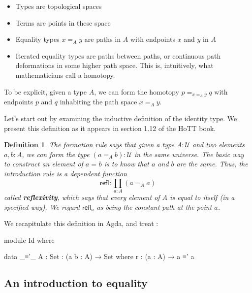 \documentclass[11pt, a4paper]{article}
\newtheorem{definition}{Definition}
\newcommand{\refl}[1]{\ensuremath{\mathsf{refl}_{#1}}\xspace}
\newcommand{\define}[1]{\textbf{#1}}
\newcommand{\id}[3][]{\ensuremath{#2 =_{#1} #3}\xspace}
\newcommand{\UU}{\ensuremath{\mathcal{U}}\xspace}
\begin{document}
\begin{itemize}[noitemsep]

\item Types are topological spaces
\item Terms are points in these space

\item Equality types $x=_{A} y$ are paths in $A$ with endpoints $x$ and $y$ in
$A$

\item Iterated equality types are paths between paths, or continuous path
deformations in some higher path space. This is, intuitively, what
mathematicians call a homotopy.

\end{itemize}

To be explicit, given a type $A$, we can form the homotopy $p=_{x=_{A} y}q$
with endpoints $p$ and $q$ inhabiting the path space $x=_{A} y$.

Let's start out by examining the inductive definition of the identity type.  We
present this definition as it appears in section 1.12 of the HoTT book.

\begin{definition}
  The formation rule says that given a type $A:\UU$ and two elements $a,b:A$, we can form the type $(\id[A]{a}{b}):\UU$ in the same universe.
  The basic way to construct an element of $\id{a}{b}$ is to know that $a$ and $b$ are the same.
  Thus, the introduction rule is a dependent function
  \[\refl{} : \prod_{a:A} (\id[A]{a}{a}) \]
  called \define{reflexivity},
  which says that every element of $A$ is equal to itself (in a specified way).  We regard $\refl{a}$ as being the
  constant path %
  at the point $a$.
\end{definition}

We recapitulate this definition in Agda, and treat : 

\begin{code}[hide]

module Id where

\end{code}
\begin{code}

  data _≡'_ {A : Set} : (a b : A) → Set where
    r : (a : A) → a ≡' a

\end{code}

\subsection{An introduction to equality}
\end{document}
